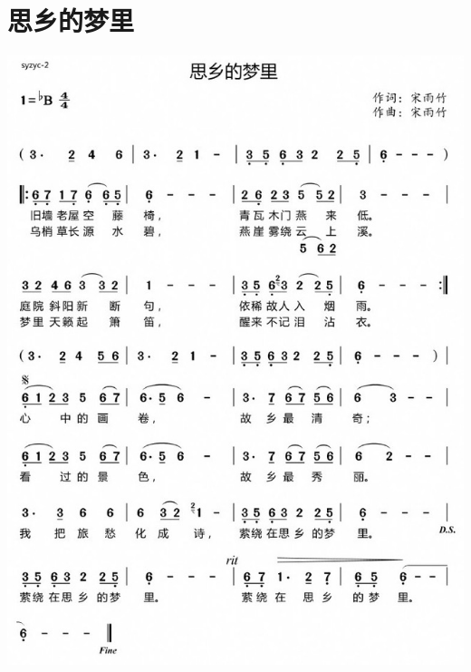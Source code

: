 \documentclass[cn,pad,twocol]{elegantbook}
\begin{document}
\section{思乡的梦里}
    \includegraphics[width=\textwidth]{dongxiao/20200901-思乡的梦里.jpeg}
\end{document}
